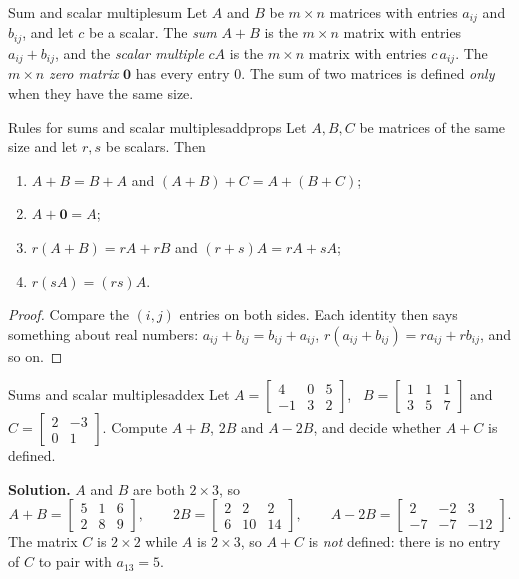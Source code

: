 \documentclass[11pt]{article}
\begin{document}
\begin{defn}{Sum and scalar multiple}{sum}
Let $A$ and $B$ be $m\times n$ matrices with entries $a_{ij}$ and $b_{ij}$, and let $c$ be a scalar. The \emph{sum} $A+B$ is the $m\times n$ matrix with entries $a_{ij}+b_{ij}$, and the \emph{scalar multiple} $cA$ is the $m\times n$ matrix with entries $c\,a_{ij}$. The $m\times n$ \emph{zero matrix} $\mathbf{0}$ has every entry $0$. The sum of two matrices is defined \emph{only} when they have the same size.
\end{defn}

\begin{thm}{Rules for sums and scalar multiples}{addprops}
Let $A,B,C$ be matrices of the same size and let $r,s$ be scalars. Then
\begin{enumerate}[label=(\alph*),itemsep=1pt]
  \item $A+B=B+A$ and $(A+B)+C=A+(B+C)$;
  \item $A+\mathbf{0}=A$;
  \item $r(A+B)=rA+rB$ and $(r+s)A=rA+sA$;
  \item $r(sA)=(rs)A$.
\end{enumerate}
\end{thm}

\begin{proof}
Compare the $(i,j)$ entries on both sides. Each identity then says something about real numbers: $a_{ij}+b_{ij}=b_{ij}+a_{ij}$, $r(a_{ij}+b_{ij})=ra_{ij}+rb_{ij}$, and so on.
\end{proof}

\begin{exmp}{Sums and scalar multiples}{addex}
Let $A=\begin{bmatrix}4&0&5\\-1&3&2\end{bmatrix}$, \ $B=\begin{bmatrix}1&1&1\\3&5&7\end{bmatrix}$ and $C=\begin{bmatrix}2&-3\\0&1\end{bmatrix}$. Compute $A+B$, $2B$ and $A-2B$, and decide whether $A+C$ is defined.

\textbf{Solution.} $A$ and $B$ are both $2\times3$, so
\[
A+B=\begin{bmatrix}5&1&6\\2&8&9\end{bmatrix},\qquad
2B=\begin{bmatrix}2&2&2\\6&10&14\end{bmatrix},\qquad
A-2B=\begin{bmatrix}2&-2&3\\-7&-7&-12\end{bmatrix}.
\]
The matrix $C$ is $2\times2$ while $A$ is $2\times3$, so $A+C$ is \emph{not} defined: there is no entry of $C$ to pair with $a_{13}=5$.
\end{exmp}
\end{document}
